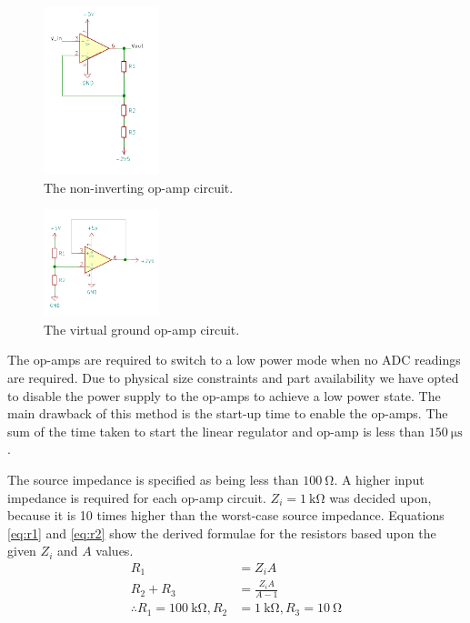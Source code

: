 \documentclass[12pt]{article}
\begin{document}
\begin{figure}[H]
	\centering
	\includegraphics[width=0.3\textwidth]{gain_circuit}
	\caption{The non-inverting op-amp circuit.}
	\label{fig:non-inverting-op-amp}
\end{figure}

\begin{figure}[H]
	\centering
	\includegraphics[width=0.3\textwidth]{virtual_ground_circuit}
	\caption{The virtual ground op-amp circuit.}
	\label{fig:half-supply}
\end{figure}

The op-amps are required to switch to a low power mode when no ADC readings are required.
Due to physical size constraints and part availability we have opted to disable the power supply to the op-amps to achieve a low power state.
The main drawback of this method is the start-up time to enable the op-amps.
The sum of the time taken to start the linear regulator and op-amp is less than $\SI{150}{\micro\second}$.

The source impedance is specified as being less than $\SI{100}{\ohm}$.
A higher input impedance is required for each op-amp circuit.
$Z_i = \SI{1}{\kilo\ohm}$ was decided upon, because it is 10 times higher than the worst-case source impedance.
Equations \ref{eq:r1} and \ref{eq:r2} show the derived formulae for the resistors based upon the given $Z_i$ and $A$ values.
\begin{align}
	R_1 &= Z_i A \label{eq:r1} \\
	R_2 + R_3 &= \frac{Z_i A}{A - 1} \label{eq:r2} \\[1em]
	\therefore R_1 = \SI{100}{\kilo\ohm}, R_2 &= \SI{1}{\kilo\ohm}, R_3 = \SI{10}{\ohm} \nonumber
\end{align}
\end{document}
